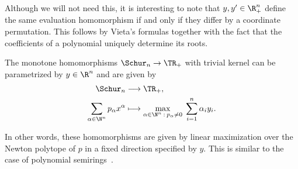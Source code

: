 Although we will not need this, it is interesting to note that $y, y' \in \R_+^n$ define the same evaluation homomorphism if and only if they differ by a coordinate permutation.
This follows by Vieta's formulas together with the fact that the coefficients of a polynomial uniquely determine its roots.

\begin{prop}
	\label{trop_schur}
	The monotone homomorphisms $\Schur_n \to \TR_+$ with trivial kernel can be parametrized by $y \in \R^n$ and are given by \smallskip
	\begin{align}
		\begin{split}
			\label{trop_schur_eq}
			\Schur_n & \longrightarrow \TR_+, \\
			\sum_{\alpha \in \N^n} p_\alpha x^\alpha & \longmapsto \max_{\alpha \in \N^n \::\: p_\alpha \neq 0} \; \sum_{i=1}^n \alpha_i y_i.
		\end{split}
	\end{align}
\end{prop}

In other words, these homomorphisms are given by linear maximization over the Newton polytope of $p$ in a fixed direction specified by $y$.
This is similar to the case of polynomial semirings~\cite[Example~2.9]{vergleichsstellensatz}.

